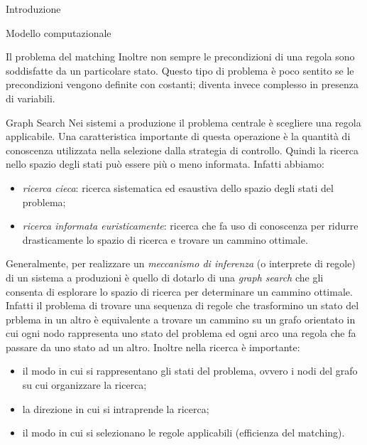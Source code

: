\begin{chapter}{Introduzione}
\begin{section}{Modello computazionale}
\begin{subsection}{Il problema del matching}
    Inoltre non sempre le precondizioni di una regola sono soddisfatte da un particolare
    stato. Questo tipo di problema \`e poco sentito se le precondizioni vengono definite
    con costanti; diventa invece complesso in presenza di variabili.
	\end{subsection}

	\begin{subsection}{Graph Search}
	Nei sistemi a produzione il problema centrale \`e scegliere una regola applicabile. Una
    caratteristica importante di questa operazione \`e la quantit\`a di conoscenza utilizzata
    nella selezione dalla strategia di controllo. Quindi la ricerca nello spazio degli stati
    pu\`o essere pi\`u o meno informata. Infatti abbiamo:

	\begin{itemize}
	    \item \textit{ricerca cieca}: ricerca sistematica ed esaustiva dello spazio degli
              stati del problema;
	    \item \textit{ricerca informata euristicamente}: ricerca che fa uso di
              conoscenza per ridurre drasticamente lo spazio di ricerca e trovare un cammino ottimale. 
	\end{itemize}

	Generalmente, per realizzare un \textit{meccanismo di inferenza} (o
    interprete di regole) di un sistema a produzioni \`e quello di dotarlo di
    una \textit{graph search} che gli consenta di esplorare lo spazio di ricerca
    per determinare un cammino ottimale. Infatti il problema di trovare una
    sequenza di regole che trasformino un stato del prblema in un altro \`e
    equivalente a trovare un cammino su un grafo orientato in cui ogni nodo
    rappresenta uno stato del problema ed ogni arco una regola che fa passare
    da uno stato ad un altro. Inoltre nella ricerca \`e importante:

	\begin{itemize}
	    \item il modo in cui si rappresentano gli stati del problema, ovvero i
              nodi del grafo su cui organizzare la ricerca;
	    \item la direzione in cui si intraprende la ricerca;
	    \item il modo in cui si selezionano le regole applicabili (efficienza del matching). 	
	\end{itemize}
	\end{subsection}
	  	

\end{section}
\end{chapter}
